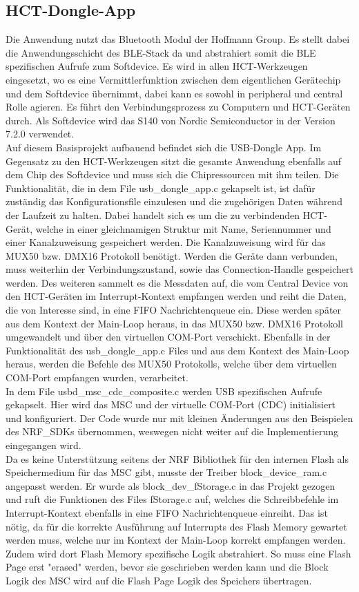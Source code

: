 \subsection{HCT-Dongle-App}
Die Anwendung nutzt das Bluetooth Modul der Hoffmann Group. Es stellt dabei die Anwendungsschicht des \ac{BLE}-Stack da und abstrahiert somit die \ac{BLE} spezifischen Aufrufe zum Softdevice. Es wird in allen \ac{HCT}-Werkzeugen eingesetzt, wo es eine Vermittlerfunktion zwischen dem eigentlichen Gerätechip und dem Softdevice übernimmt, dabei kann es sowohl in peripheral und central Rolle agieren. Es führt den Verbindungsprozess zu Computern und \ac{HCT}-Geräten durch. Als Softdevice wird das S140 von Nordic Semiconductor in der Version 7.2.0 verwendet. \\
Auf diesem Basisprojekt aufbauend befindet sich die \ac{USB}-Dongle App. Im Gegensatz zu den \ac{HCT}-Werkzeugen sitzt die gesamte Anwendung ebenfalls auf dem Chip des Softdevice und muss sich die Chipressourcen mit ihm teilen. Die Funktionalität, die in dem File usb\_dongle\_app.c gekapselt ist, ist dafür zuständig das Konfigurationsfile einzulesen und die zugehörigen Daten während der Laufzeit zu halten. Dabei handelt sich es um die zu verbindenden \ac{HCT}-Gerät, welche in einer gleichnamigen Struktur mit Name, Seriennummer und einer Kanalzuweisung gespeichert werden. Die Kanalzuweisung wird für das MUX50 bzw. DMX16 Protokoll benötigt. Werden die Geräte dann verbunden, muss weiterhin der Verbindungszustand, sowie das Connection-Handle gespeichert werden. Des weiteren sammelt es die Messdaten auf, die vom Central Device von den \ac{HCT}-Geräten im Interrupt-Kontext empfangen werden und reiht die Daten, die von Interesse sind, in eine \ac{FIFO} Nachrichtenqueue ein. Diese werden später aus dem Kontext der Main-Loop heraus, in das MUX50 bzw. DMX16 Protokoll umgewandelt und über den virtuellen COM-Port verschickt. Ebenfalls in der Funktionalität des usb\_dongle\_app.c Files und aus dem Kontext des Main-Loop heraus, werden die Befehle des MUX50 Protokolls, welche über dem virtuellen COM-Port empfangen wurden, verarbeitet.\\
In dem File usbd\_msc\_cdc\_composite.c werden \ac{USB} spezifischen Aufrufe gekapselt. Hier wird das \ac{MSC} und der virtuelle COM-Port (CDC) initialisiert und konfiguriert. Der Code wurde nur mit kleinen Änderungen aus den Beispielen des NRF\_SDKs übernommen, weswegen nicht weiter auf die Implementierung eingegangen wird.\\
Da es keine Unterstützung seitens der NRF Bibliothek für den internen Flash als Speichermedium für das \ac{MSC} gibt, musste der Treiber block\_device\_ram.c angepasst werden. Er wurde als block\_dev\_fStorage.c in das Projekt gezogen und ruft die Funktionen des Files fStorage.c auf, welches die Schreibbefehle im Interrupt-Kontext ebenfalls in eine \ac{FIFO} Nachrichtenqueue einreiht. Das ist nötig, da für die korrekte Ausführung auf Interrupts des Flash Memory gewartet werden muss, welche nur im Kontext der Main-Loop korrekt empfangen werden. Zudem wird dort Flash Memory spezifische Logik abstrahiert. So muss eine Flash Page erst "erased" werden, bevor sie geschrieben werden kann und die Block Logik des \ac{MSC} wird auf die Flash Page Logik des Speichers übertragen.


